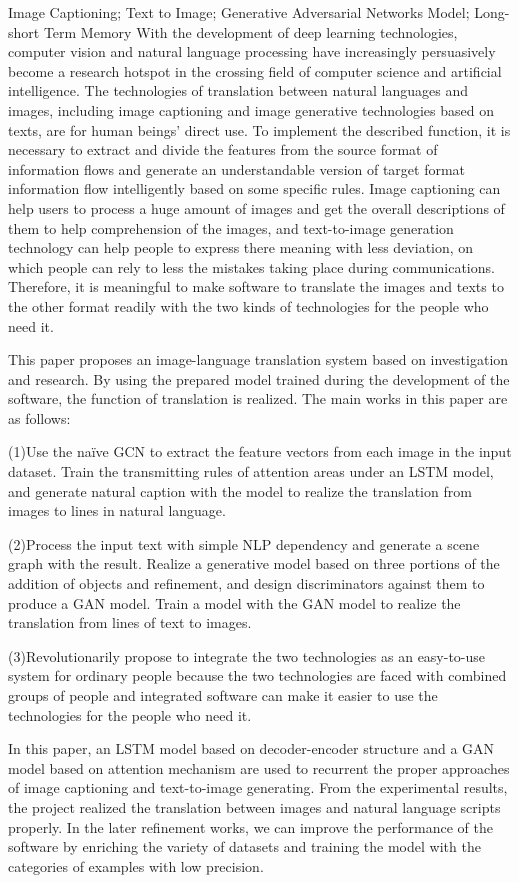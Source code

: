 \begin{enabstract}{Image Captioning; Text to Image; Generative Adversarial Networks Model; Long-short Term Memory}
  With the development of deep learning technologies, computer vision and natural language processing have increasingly persuasively become a research hotspot in the crossing field of computer science and artificial intelligence. The technologies of translation between natural languages and images, including image captioning and image generative technologies based on texts, are for human beings' direct use. To implement the described function, it is necessary to extract and divide the features from the source format of information flows and generate an understandable version of target format information flow intelligently based on some specific rules. Image captioning can help users to process a huge amount of images and get the overall descriptions of them to help comprehension of the images, and text-to-image generation technology can help people to express there meaning with less deviation, on which people can rely to less the mistakes taking place during communications. Therefore, it is meaningful to make software to translate the images and texts to the other format readily with the two kinds of technologies for the people who need it.
  
  This paper proposes an image-language translation system based on investigation and research. By using the prepared model trained during the development of the software, the function of translation is realized. The main works in this paper are as follows:

  (1)Use the naïve GCN to extract the feature vectors from each image in the input dataset. Train the transmitting rules of attention areas under an LSTM model, and generate natural caption with the model to realize the translation from images to lines in natural language.

  (2)Process the input text with simple NLP dependency and generate a scene graph with the result. Realize a generative model based on three portions of the addition of objects and refinement, and design discriminators against them to produce a GAN model. Train a model with the GAN model to realize the translation from lines of text to images.

  (3)Revolutionarily propose to integrate the two technologies as an easy-to-use system for ordinary people because the two technologies are faced with combined groups of people and integrated software can make it easier to use the technologies for the people who need it.

  In this paper, an LSTM model based on decoder-encoder structure and a GAN model based on attention mechanism are used to recurrent the proper approaches of image captioning and text-to-image generating. From the experimental results, the project realized the translation between images and natural language scripts properly. In the later refinement works, we can improve the performance of the software by enriching the variety of datasets and training the model with the categories of examples with low precision.

\end{enabstract}
